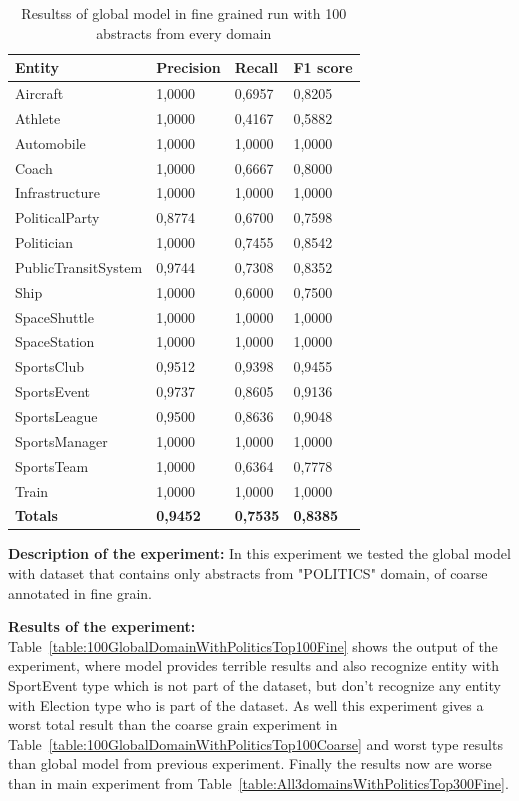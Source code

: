 \documentclass[thesis=M,english]{FITthesis}[2018/05/30]
\begin{document}
	\begin{table}[H]\centering
		\begin{tabular}{|l|l|l|l|}
			\hline {\textbf{Entity}} & {\textbf{Precision}} & {\textbf{Recall}} & {\textbf{F1 score}}\\\hline
				Aircraft & 1,0000 & 0,6957 & 0,8205\\
				Athlete & 1,0000 & 0,4167 & 0,5882\\
				Automobile & 1,0000 & 1,0000 & 1,0000\\ 
				Coach & 1,0000 & 0,6667 & 0,8000\\
				Infrastructure & 1,0000 & 1,0000 & 1,0000\\
				PoliticalParty & 0,8774 & 0,6700 & 0,7598\\
				Politician & 1,0000 & 0,7455 & 0,8542\\
				PublicTransitSystem & 0,9744 & 0,7308 & 0,8352\\
				Ship & 1,0000 & 0,6000 & 0,7500\\
				SpaceShuttle & 1,0000 & 1,0000 & 1,0000\\
				SpaceStation & 1,0000 & 1,0000 & 1,0000\\ 
				SportsClub & 0,9512 & 0,9398 & 0,9455\\
				SportsEvent & 0,9737 & 0,8605 & 0,9136\\
				SportsLeague & 0,9500 & 0,8636 & 0,9048\\
				SportsManager & 1,0000 & 1,0000 & 1,0000\\
				SportsTeam & 1,0000 & 0,6364 & 0,7778\\
				Train & 1,0000 & 1,0000 & 1,0000\\\hline
				\textbf{Totals} & \textbf{0,9452} & \textbf{0,7535} & \textbf{0,8385}\\\hline
		\end{tabular}
		\caption{Resultss of global model in fine grained run with 100 abstracts from every domain \label{table:100GlobalDomainWithAllAbstractsTop100Fine}}
	\end{table}


	\textbf{Description of the experiment:} In this experiment we tested the global model with dataset that contains only abstracts from "POLITICS" domain, of coarse annotated in fine grain.  

	\textbf{Results of the experiment:} Table~\ref{table:100GlobalDomainWithPoliticsTop100Fine} shows the output of the experiment, where model provides terrible results and also recognize entity with SportEvent type which is not part of the dataset, but don't recognize any entity with Election type who is part of the dataset. As well this experiment gives a worst total result than the coarse grain experiment in Table~\ref{table:100GlobalDomainWithPoliticsTop100Coarse} and worst type results than global model from previous experiment. Finally the results now are worse than in main experiment from Table~\ref{table:All3domainsWithPoliticsTop300Fine}.
\end{document}
